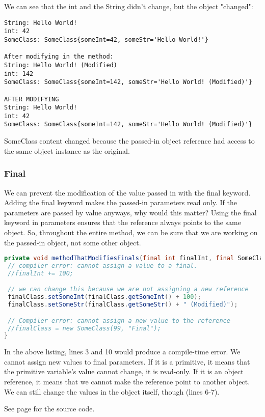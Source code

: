 We can see that the int and the String didn't change, but the object "changed":

\begin{lstlisting}
String: Hello World!
int: 42
SomeClass: SomeClass{someInt=42, someStr='Hello World!'}

After modifying in the method:
String: Hello World! (Modified)
int: 142
SomeClass: SomeClass{someInt=142, someStr='Hello World! (Modified)'}

AFTER MODIFYING
String: Hello World!
int: 42
SomeClass: SomeClass{someInt=142, someStr='Hello World! (Modified)'}
\end{lstlisting}

SomeClass content changed because the passed-in object reference had access to the same object instance as the original.

\subsubsection{Final}
We can prevent the modification of the value passed in with the final keyword. Adding the final keyword makes the passed-in parameters read only. If the parameters are passed by value anyways, why would this matter? Using the final keyword in parameters ensures that the reference always points to the same object. So, throughout the entire method, we can be sure that we are working on the passed-in object, not some other object.
\begin{lstlisting}[language=Java]
private void methodThatModifiesFinals(final int finalInt, final SomeClass finalClass) {
 // compiler error: cannot assign a value to a final.
 //finalInt += 100;

 // we can change this because we are not assigning a new reference
 finalClass.setSomeInt(finalClass.getSomeInt() + 100);
 finalClass.setSomeStr(finalClass.getSomeStr() + " (Modified)");

 // Compiler error: cannot assign a new value to the reference
 //finalClass = new SomeClass(99, "Final");
}
\end{lstlisting}

In the above listing, lines 3 and 10 would produce a compile-time error. We cannot assign new values to final parameters. If it is a primitive, it means that the primitive variable's value cannot change, it is read-only. If it is an object reference, it means that we cannot make the reference point to another object. We can still change the values in the object itself, though (lines 6-7). 

See page \pageref{App:AppendixL} for the source code.
